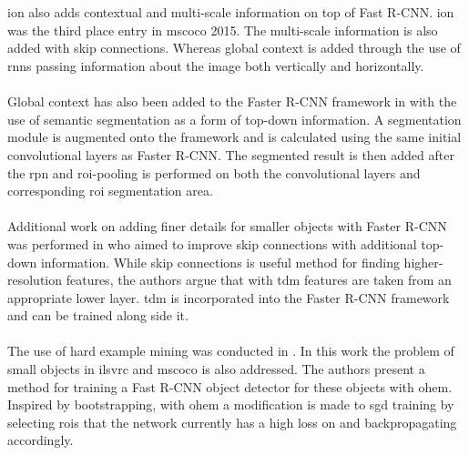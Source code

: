 \\\\
\gls{ion} \cite{ion} also adds contextual and multi-scale information on top of Fast R-CNN. \gls{ion} was the third place entry in \gls{mscoco} 2015. The multi-scale information is also added with skip connections. Whereas global context is added through the use of \glspl{rnn} passing information about the image both vertically and horizontally.
\\\\
Global context has also been added to the Faster R-CNN framework in \cite{contextprim} with the use of semantic segmentation as a form of top-down information. A segmentation module is augmented onto the framework and is calculated using the same initial convolutional layers as Faster R-CNN. The segmented result is then added after the \gls{rpn} and \gls{roi}-pooling is performed on both the convolutional layers and corresponding \gls{roi} segmentation area.
\\\\
Additional work on adding finer details for smaller objects with Faster R-CNN was performed in \cite{beyondskip} who aimed to improve skip connections with additional top-down information. While skip connections is useful method for finding higher-resolution features, the authors argue that with \gls{tdm} features are taken from an appropriate lower layer. \gls{tdm} is incorporated into the Faster R-CNN framework and can be trained along side it. 
\\\\
The use of hard example mining was conducted in \cite{ohem}. In this work the problem of small objects in \gls{ilsvrc} and \gls{mscoco} is also addressed. The authors present a method for training a Fast R-CNN object detector for these objects with \gls{ohem}. Inspired by bootstrapping, with \gls{ohem} a modification is made to \gls{sgd} training by selecting \glspl{roi} that the network currently has a high loss on and backpropagating accordingly. 
\\\\
